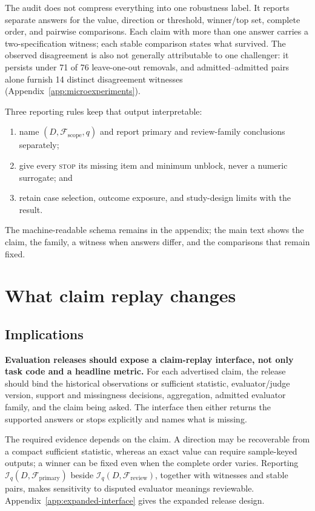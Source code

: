 \documentclass{article}
\newcommand{\STOP}{\textsc{stop}}
\newcommand{\F}{\mathcal F}
\newcommand{\Fpri}{\F_{\mathrm{primary}}}
\newcommand{\Frev}{\F_{\mathrm{review}}}
\newcommand{\I}{\mathcal I}
\begin{document}
The audit does not compress everything into one robustness label.  It reports separate answers for the value, direction or threshold, winner/top set, complete order, and pairwise comparisons.  Each claim with more than one answer carries a two-specification witness; each stable comparison states what survived.  The observed disagreement is also not generally attributable to one challenger: it persists under 71 of 76 leave-one-out removals, and admitted--admitted pairs alone furnish 14 distinct disagreement witnesses (Appendix~\ref{app:microexperiments}).

Three reporting rules keep that output interpretable:
\begin{enumerate}[leftmargin=*,itemsep=.15ex,topsep=.25ex]
  \item name \((D,\F_{\mathrm{scope}},q)\) and report primary and review-family conclusions separately;
  \item give every \STOP{} its missing item and minimum unblock, never a numeric surrogate; and
  \item retain case selection, outcome exposure, and study-design limits with the result.
\end{enumerate}
The machine-readable schema remains in the appendix; the main text shows the claim, the family, a witness when answers differ, and the comparisons that remain fixed.

\section{What claim replay changes}

\subsection{Implications}

\textbf{Evaluation releases should expose a claim-replay interface, not only task code and a headline metric.}  For each advertised claim, the release should bind the historical observations or sufficient statistic, evaluator/judge version, support and missingness decisions, aggregation, admitted evaluator family, and the claim being asked.  The interface then either returns the supported answers or stops explicitly and names what is missing.

The required evidence depends on the claim.  A direction may be recoverable from a compact sufficient statistic, whereas an exact value can require sample-keyed outputs; a winner can be fixed even when the complete order varies.  Reporting \(\I_q(D,\Fpri)\) beside \(\I_q(D,\Frev)\), together with witnesses and stable pairs, makes sensitivity to disputed evaluator meanings reviewable.  Appendix~\ref{app:expanded-interface} gives the expanded release design.
\end{document}

